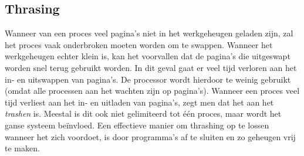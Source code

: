 \subsection{Thrasing}

Wanneer van een proces veel pagina's niet in het werkgeheugen geladen zijn, zal het proces vaak onderbroken moeten worden om te swappen. Wanneer het werkgeheugen echter klein is, kan het voorvallen dat de pagina's die uitgeswapt worden snel terug gebruikt worden. In dit geval gaat er veel tijd verloren aan het in- en uitswappen van pagina's. De processor wordt hierdoor te weinig gebruikt (omdat alle processen aan het wachten zijn op pagina's). Wanneer een proces veel tijd verliest aan het in- en uitladen van pagina's, zegt men dat het aan het \emph{trashen} is. Meestal is dit ook niet gelimiteerd tot \'e\'en proces, maar wordt het ganse systeem be\"invloed. Een effectieve manier om thrashing op te lossen wanneer het zich voordoet, is door programma's af te sluiten en zo geheugen vrij te maken.






